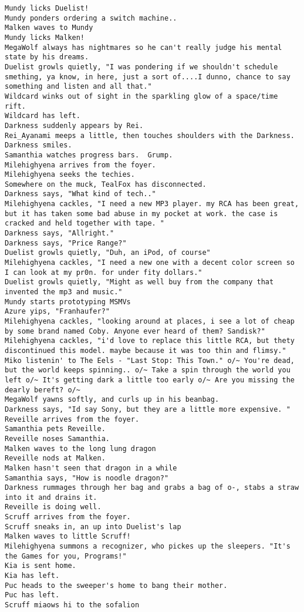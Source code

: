 \begin{verbatim}
Mundy licks Duelist!
Mundy ponders ordering a switch machine..
Malken waves to Mundy
Mundy licks Malken!
MegaWolf always has nightmares so he can't really judge his mental state by his dreams.
Duelist growls quietly, "I was pondering if we shouldn't schedule smething, ya know, in here, just a sort of....I dunno, chance to say something and listen and all that."
Wildcard winks out of sight in the sparkling glow of a space/time rift.
Wildcard has left.
Darkness suddenly appears by Rei.
Rei_Ayanami meeps a little, then touches shoulders with the Darkness.
Darkness smiles.
Samanthia watches progress bars.  Grump.
Milehighyena arrives from the foyer.
Milehighyena seeks the techies.
Somewhere on the muck, TealFox has disconnected.
Darkness says, "What kind of tech.."
Milehighyena cackles, "I need a new MP3 player. my RCA has been great, but it has taken some bad abuse in my pocket at work. the case is cracked and held together with tape. "
Darkness says, "Allright."
Darkness says, "Price Range?"
Duelist growls quietly, "Duh, an iPod, of course"
Milehighyena cackles, "I need a new one with a decent color screen so I can look at my pr0n. for under fity dollars."
Duelist growls quietly, "Might as well buy from the company that invented the mp3 and music."
Mundy starts prototyping MSMVs
Azure yips, "Franhaufer?"
Milehighyena cackles, "looking around at places, i see a lot of cheap by some brand named Coby. Anyone ever heard of them? Sandisk?"
Milehighyena cackles, "i'd love to replace this little RCA, but thety discontinued this model. maybe because it was too thin and flimsy."
Miko listenin' to The Eels - "Last Stop: This Town." o/~ You're dead, but the world keeps spinning.. o/~ Take a spin through the world you left o/~ It's getting dark a little too early o/~ Are you missing the dearly bereft? o/~
MegaWolf yawns softly, and curls up in his beanbag.
Darkness says, "Id say Sony, but they are a little more expensive. "
Reveille arrives from the foyer.
Samanthia pets Reveille.
Reveille noses Samanthia.
Malken waves to the long lung dragon
Reveille nods at Malken.
Malken hasn't seen that dragon in a while
Samanthia says, "How is noodle dragon?"
Darkness rummages through her bag and grabs a bag of o-, stabs a straw into it and drains it.
Reveille is doing well.
Scruff arrives from the foyer.
Scruff sneaks in, an up into Duelist's lap
Malken waves to little Scruff!
Milehighyena summons a recognizer, who pickes up the sleepers. "It's the Games for you, Programs!"
Kia is sent home.
Kia has left.
Puc heads to the sweeper's home to bang their mother.
Puc has left.
Scruff miaows hi to the sofalion

\end{verbatim}
